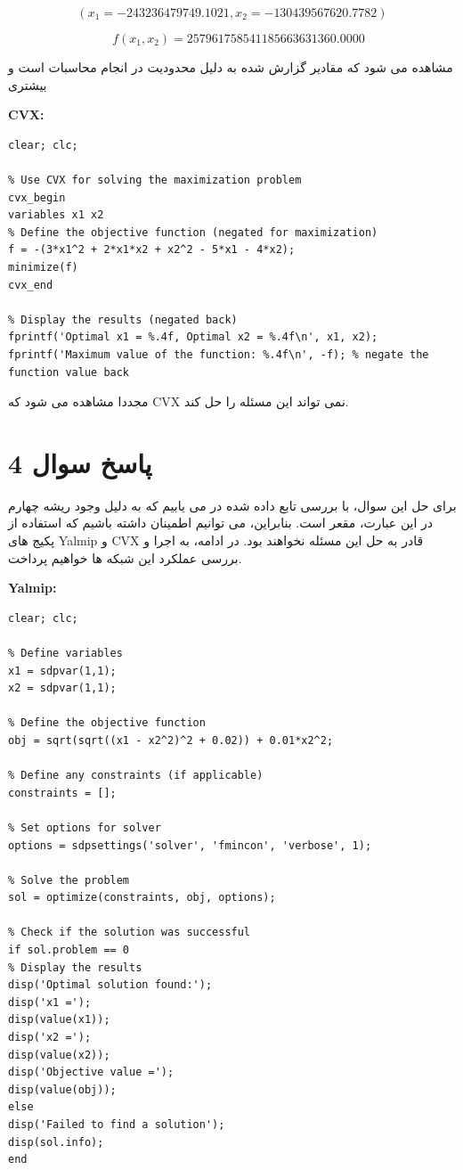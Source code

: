 \[
(x_1 = -243236479749.1021, x_2 = -130439567620.7782) 
\]

\[
\quad f(x_1, x_2) = 257961758541185663631360.0000
\]

مشاهده می شود که مقادیر گزارش شده به دلیل محدودیت در انجام محاسبات است و بیشتری

\textbf{CVX:}
\begin{latin}
	\begin{lstlisting}[frame=single,style=Matlab-Pyglike]
% Clear workspace
clear; clc;

% Use CVX for solving the maximization problem
cvx_begin
variables x1 x2
% Define the objective function (negated for maximization)
f = -(3*x1^2 + 2*x1*x2 + x2^2 - 5*x1 - 4*x2);
minimize(f)
cvx_end

% Display the results (negated back)
fprintf('Optimal x1 = %.4f, Optimal x2 = %.4f\n', x1, x2);
fprintf('Maximum value of the function: %.4f\n', -f); % negate the function value back

	\end{lstlisting}
\end{latin}

مجددا مشاهده می شود که CVX نمی تواند این مسئله را حل کند.

\section{پاسخ سوال 4}
 
 برای حل این سوال، با بررسی تابع داده شده در می یابیم که به دلیل وجود ریشه چهارم در این عبارت، مقعر است. بنابراین، می توانیم اطمینان داشته باشیم که استفاده از پکیج های Yalmip و CVX قادر به حل این مسئله نخواهند بود. در ادامه، به اجرا و بررسی عملکرد این شبکه ها خواهیم پرداخت.
 
 \textbf{Yalmip:}
 \begin{latin}
 	\begin{lstlisting}[frame=single,style=Matlab-Pyglike]
% Clear workspace
clear; clc;

% Define variables
x1 = sdpvar(1,1);
x2 = sdpvar(1,1);

% Define the objective function
obj = sqrt(sqrt((x1 - x2^2)^2 + 0.02)) + 0.01*x2^2;

% Define any constraints (if applicable)
constraints = [];

% Set options for solver
options = sdpsettings('solver', 'fmincon', 'verbose', 1);

% Solve the problem
sol = optimize(constraints, obj, options);

% Check if the solution was successful
if sol.problem == 0
% Display the results
disp('Optimal solution found:');
disp('x1 =');
disp(value(x1));
disp('x2 =');
disp(value(x2));
disp('Objective value =');
disp(value(obj));
else
disp('Failed to find a solution');
disp(sol.info);
end
 		
 	\end{lstlisting}
 \end{latin}
 
